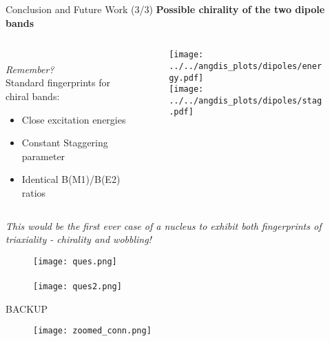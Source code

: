 \documentclass [11pt]{beamer}
\begin{document}
\begin{frame}{Conclusion and Future Work (3/3)}
\textbf{Possible chirality of the two dipole bands\\}
\begin{columns}[c]
\begin{column}{0.5\textwidth}
\\\textit{\color{red} Remember?}\\
Standard fingerprints for chiral bands:
\begin{itemize}
\item{Close excitation energies}
\item{Constant Staggering parameter}
\item{Identical B(M1)/B(E2) ratios}
\end{itemize}
\end{column}
\begin{column}{0.5\textwidth}
\begin{figure}
\texttt{[image: ../../angdis\_plots/dipoles/energy.pdf]}\\
\texttt{[image: ../../angdis\_plots/dipoles/stag.pdf]}
\end{figure}


\end{column}
\end{columns}
\textit{This would be the first ever case of a nucleus to exhibit both fingerprints of triaxiality - chirality and wobbling!}
\end{frame}


\begin{frame}
\begin{figure}
\texttt{[image: ques.png]}\\~\\
\texttt{[image: ques2.png]}
\end{figure}
\end{frame}


\begin{frame}
\centering
BACKUP
\end{frame}

\begin{frame}
\centering
\begin{figure}
\texttt{[image: zoomed\_conn.png]}
\end{figure}
\end{frame}
\end{document}
